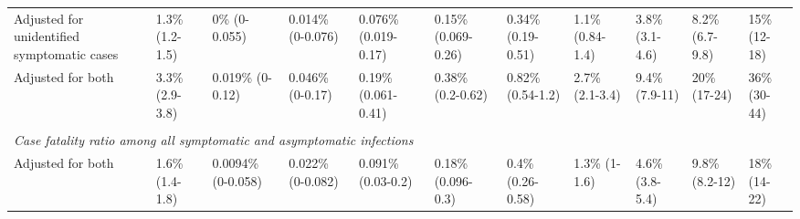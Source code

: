 \documentclass{article}
\begin{document}
\begin{table}
\begin{tabular}{p{3.5cm}p{1.8cm}p{1.8cm}p{1.8cm}p{1.8cm}p{1.8cm}p{1.6cm}p{1.5cm}p{1.5cm}p{1.5cm}p{1.5cm}}
		Adjusted for unidentified symptomatic cases & 1.3\%\hspace{4em} (1.2-1.5) & 0\%\hspace{4em} (0-0.055)      & 0.014\%\hspace{4em} (0-0.076) & 0.076\%\hspace{4em} (0.019-0.17) & 0.15\%\hspace{4em} (0.069-0.26) & 0.34\%\hspace{4em} (0.19-0.51) & 1.1\%\hspace{4em} (0.84-1.4) & 3.8\%\hspace{4em} (3.1-4.6) & 8.2\%\hspace{4em} (6.7-9.8) & 15\%\hspace{4em} (12-18) \\[.4em]
		
		Adjusted for both & 3.3\%\hspace{4em} (2.9-3.8) & 0.019\%\hspace{4em} (0-0.12)   & 0.046\%\hspace{4em} (0-0.17)  & 0.19\%\hspace{4em} (0.061-0.41)  & 0.38\%\hspace{4em} (0.2-0.62)   & 0.82\%\hspace{4em} (0.54-1.2)  & 2.7\%\hspace{4em} (2.1-3.4)  & 9.4\%\hspace{4em} (7.9-11)  & 20\%\hspace{4em} (17-24)    & 36\%\hspace{4em} (30-44) \\[.4em]
		\hline \\[-.8em]
		\multicolumn{10}{l}{\textit{Case fatality ratio among all symptomatic and asymptomatic infections}} \\[.4em]
		Adjusted for both & 1.6\%\hspace{4em} (1.4-1.8) & 0.0094\%\hspace{4em} (0-0.058) & 0.022\%\hspace{4em} (0-0.082) & 0.091\%\hspace{4em} (0.03-0.2)   & 0.18\%\hspace{4em} (0.096-0.3)  & 0.4\%\hspace{4em} (0.26-0.58)  & 1.3\%\hspace{4em} (1-1.6)    & 4.6\%\hspace{4em} (3.8-5.4) & 9.8\%\hspace{4em} (8.2-12)  & 18\%\hspace{4em} (14-22) \\[.4em]
		\hline
	\end{tabular}
	
	
	
\end{table}
\end{document}
